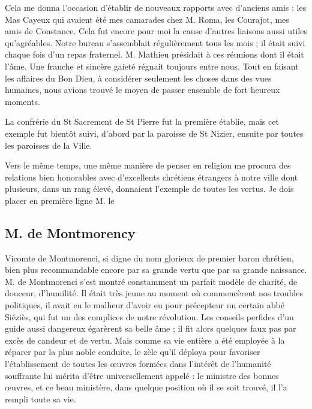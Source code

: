 \documentclass[11pt,a4paper]{report}
\begin{document}
Cela me donna l'occasion d'établir de nouveaux rapports avec d'anciens amis : les Mas Cayeux qui avaient été mes camarades chez M. Roma, les Courajot, mes amis de Constance. Cela fut encore pour moi la cause d'autres liaisons aussi utiles qu'agréables. Notre bureau s'assemblait régulièrement tous les mois ; il était suivi chaque fois d'un repas fraternel. M. Mathieu présidait à ces réunions dont il était l'âme. Une franche et sincère gaieté régnait toujours entre nous. Tout en faisant les affaires du Bon Dieu, à considérer seulement les choses dans des vues humaines, nous avions trouvé le moyen de passer ensemble de fort heureux moments.

La confrérie du St Sacrement de St Pierre fut la première établie, mais cet exemple fut bientôt suivi, d'abord par la paroisse de St Nizier, ensuite par toutes les paroisses de la Ville.

Vers le même temps, une même manière de penser en religion me procura des relations bien honorables avec d'excellents chrétiens étrangers à notre ville dont plusieurs, dans un rang élevé, donnaient l'exemple de toutes les vertus. Je dois placer en première ligne M. le

\subsection*{M. de Montmorency}

Vicomte de Montmorenci, si digne du nom glorieux de premier baron chrétien, bien plus recommandable encore par sa grande vertu que par sa grande naissance. M. de Montmorenci s'est montré constamment un parfait modèle de charité, de douceur, d'humilité. Il était très jeune au moment où commencèrent nos troubles politiques, il avait eu le malheur d'avoir eu pour précepteur un certain abbé Siéziès, qui fut un des complices de notre révolution. Les conseils perfides d'un guide aussi dangereux égarèrent sa belle âme ; il fit alors quelques faux pas par excès de candeur et de vertu. Mais comme sa vie entière a été employée à la réparer par la plus noble conduite, le zèle qu'il déploya pour favoriser l'établissement de toutes les œuvres formées dans l'intérêt de l'humanité souffrante lui mérita d'être universellement appelé : le ministre des bonnes œuvres, et ce beau ministère, dans quelque position où il se soit trouvé, il l'a rempli toute sa vie.
\end{document}
